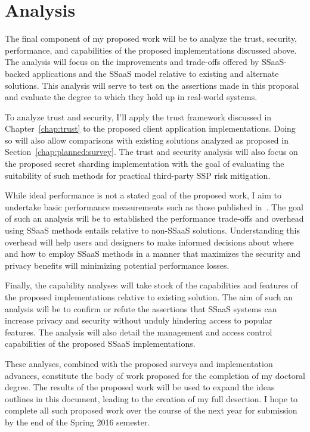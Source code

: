 \section{Analysis}
\label{chap:planned:analysis}

The final component of my proposed work will be to analyze the trust,
security, performance, and capabilities of the proposed
implementations discussed above. The analysis will focus on the
improvements and trade-offs offered by SSaaS-backed applications and
the SSaaS model relative to existing and alternate solutions. This
analysis will serve to test on the assertions made in this proposal
and evaluate the degree to which they hold up in real-world systems.

To analyze trust and security, I'll apply the trust framework
discussed in Chapter~\ref{chap:trust} to the proposed client
application implementations. Doing so will also allow comparisons with
existing solutions analyzed as proposed in
Section~\ref{chap:planned:survey}. The trust and security analysis
will also focus on the proposed secret sharding implementation with
the goal of evaluating the suitability of such methods for practical
third-party SSP risk mitigation.

While ideal performance is not a stated goal of the proposed work, I
aim to undertake basic performance measurements such as those
published in~\cite{custos-trios}. The goal of such an analysis will be
to established the performance trade-offs and overhead using SSaaS
methods entails relative to non-SSaaS solutions. Understanding this
overhead will help users and designers to make informed decisions
about where and how to employ SSaaS methods in a manner that maximizes
the security and privacy benefits will minimizing potential
performance losses.

Finally, the capability analyses will take stock of the capabilities
and features of the proposed implementations relative to existing
solution. The aim of such an analysis will be to confirm or refute the
assertions that SSaaS systems can increase privacy and security
without unduly hindering access to popular features. The analysis will
also detail the management and access control capabilities of the
proposed SSaaS implementations.

These analyses, combined with the proposed surveys and implementation
advances, constitute the body of work proposed for the completion of
my doctoral degree. The results of the proposed work will be used to
expand the ideas outlines in this document, leading to the creation of
my full desertion. I hope to complete all such proposed work over the
course of the next year for submission by the end of the Spring 2016
semester.

